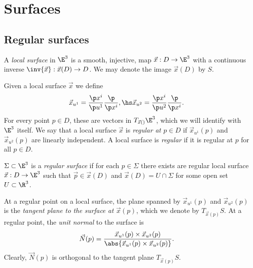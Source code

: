 \documentclass{article}
\begin{document}
\section{Surfaces}

\subsection{Regular surfaces}

\begin{definition}
    A \emph{local surface} in $\E^3$ is a smooth, injective, map $\vec x: D\to\E^3$
    with a continuous inverse $\inv{\vec x} : \vec x(D) \to D$. We may denote the image
    $\vec x (D)$ by $S$.
\end{definition}

\begin{definition}
    Given a local surface $\vec x$ we define
    \begin{align*}
        \vec x_{u^1} = \frac{\p x^i}{\p u^1}\frac{\p}{\p x^i}, \hs 
        \vec x_{u^2} = \frac{\p x^i}{\p u^2}\frac{\p}{\p x^i}.
    \end{align*}
    For every point $p\in D$, these are vectors in $T_{\vec x()}\E^3$, which we will 
    identify with $\E^3$ itself. We say that a local surface $\vec x$ is \emph{regular
    at $p\in D$} if $\vec x_{u^1}(p)$ and $\vec x_{u^2}(p)$ are linearly independent.
    A local surface is \emph{regular} if it is regular at $p$ for all $p\in D$.
\end{definition}

\begin{definition}
    $\Sigma\subset\E^3$ is a \emph{regular surface} if for each $p\in\Sigma$ there
    exists are regular local surface $\vec x:D\to\E^3$ such that $\vec p\in\vec x(D)$
    and $\vec x(D)=U\cap\Sigma$ for some open set $U\subset\R^3$.
\end{definition}

\begin{definition}
    At a regular point on a local surface, the plane spanned by $\vec x_{u^1}(p)$ 
    and $\vec x_{u^2}(p)$ is the \emph{tangent plane to the surface at $\vec x(p)$},
    which we denote by $T_{\vec x(p)}S$. At a regular point, the \emph{unit normal}
    to the surface is 
    \begin{align*}
        \vec N(p)=\frac{\vec x_{u^1}(p)\times\vec x_{u^2}(p)}{\abs{\vec x_{u^1}(p)\times\vec x_{u^2}(p)}}.
    \end{align*}
    Clearly, $\vec N(p)$ is orthogonal to the tangent plane $T_{\vec x(p)}S$.
\end{definition}
\end{document}
